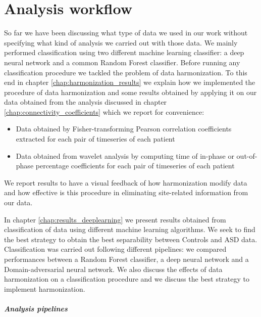 \documentclass[11pt]{report}
\begin{document}
\chapter{Analysis workflow}\label{sec:analysis_workflow}
So far we have been discussing what type of data we used in our work without specifying what kind of analysis we carried out with those data.
We mainly performed classification using two different machine learning classifier: a deep neural network and a common Random Forest classifier.
Before running any classification procedure we tackled the problem of data harmonization. To this end in chapter \ref{chap:harmonization_results} we explain how we implemented the procedure of data harmonization and some results obtained by applying it on our data obtained from the analysis discussed in chapter \ref{chap:connectivity_coefficients} which we report for convenience:
\begin{itemize}
\item Data obtained by Fisher-transforming Pearson correlation coefficients extracted for each pair of timeseries of each patient
\item Data obtained from wavelet analysis by computing time of in-phase or out-of-phase percentage coefficients for each pair of timeseries of each patient
\end{itemize}
We report results to have a visual feedback of how harmonization modify data and how effective is this procedure in eliminating site-related information from our data.

In chapter \ref{chap:results_deeplearning} we present results obtained from classification of data using different machine learning algorithms. We seek to find the best strategy to obtain the best separability between Controls and ASD data.
Classification was carried out following different pipelines: we compared performances between a Random Forest classifier, a deep neural network and a Domain-adversarial neural network. We also discuss the effects of data harmonization on a classification procedure and we discuss the best strategy to implement harmonization.

\paragraph{Analysis pipelines}\hfill
\end{document}
